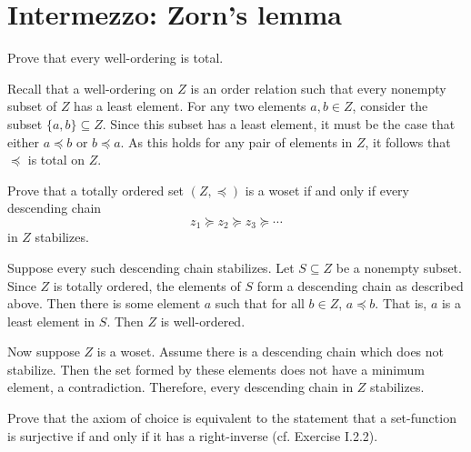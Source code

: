 \documentclass[../../master.tex]{subfiles}
\begin{document}
\section{Intermezzo: Zorn's lemma}

    \begin{problem}
        Prove that every well-ordering is total.
    \end{problem}

    \begin{solution}
        Recall that a well-ordering on $Z$ is an order relation such that every
        nonempty subset of $Z$ has a least element. For any two elements $a, b
        \in Z$, consider the subset $\{a, b\} \subseteq Z$. Since this subset
        has a least element, it must be the case that either $a \preceq b$ or $b
        \preceq a$. As this holds for any pair of elements in $Z$, it follows
        that $\preceq$ is total on $Z$.
    \end{solution}

    \begin{problem}
        Prove that a totally ordered set $(Z, \preceq)$ is a woset if and only
        if every descending chain
        \[
        z_1 \succeq z_2 \succeq z_3 \succeq \cdots
        \] 
        in $Z$ stabilizes.
    \end{problem}

    \begin{solution}
        Suppose every such descending chain stabilizes. Let $S \subseteq Z$ be
        a nonempty subset. Since $Z$ is totally ordered, the elements of $S$
        form a descending chain as described above. Then there is some element
        $a$ such that for all $b \in Z$, $a \preceq b$. That is, $a$ is a least
        element in $S$. Then $Z$ is well-ordered.

        Now suppose $Z$ is a woset. Assume there is a descending chain which
        does not stabilize. Then the set formed by these elements does not have
        a minimum element, a contradiction. Therefore, every descending chain in
        $Z$ stabilizes.
    \end{solution}

    \begin{problem}
        Prove that the axiom of choice is equivalent to the statement that a
        set-function is surjective if and only if it has a right-inverse (cf.
        Exercise I.2.2).
    \end{problem}
\end{document}
